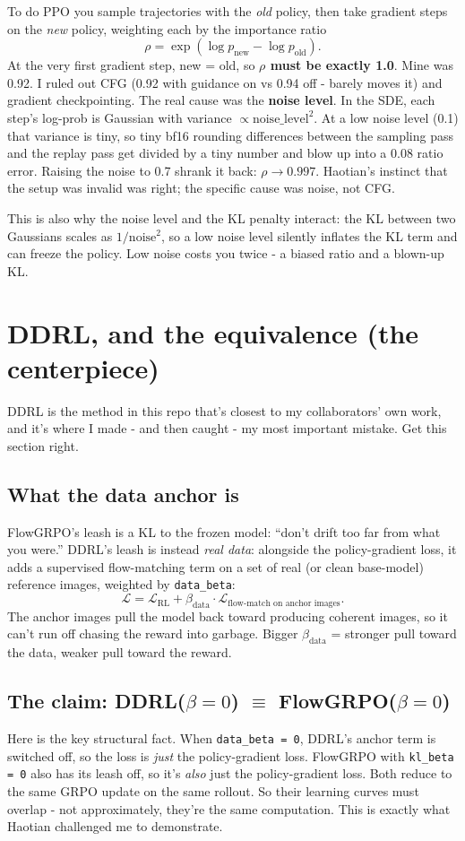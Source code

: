 \documentclass[11pt]{article}
\newcommand{\code}[1]{\texttt{\small #1}}
\begin{document}
To do PPO you sample trajectories with the \textit{old} policy, then take gradient
steps on the \textit{new} policy, weighting each by the importance ratio
\[
\rho = \exp(\log p_{\text{new}} - \log p_{\text{old}}).
\]
At the very first gradient step, new = old, so \textbf{$\rho$ must be exactly 1.0}.
Mine was 0.92. I ruled out CFG (0.92 with guidance on vs 0.94 off - barely moves it)
and gradient checkpointing. The real cause was the \textbf{noise level}. In the SDE,
each step's log-prob is Gaussian with variance $\propto \text{noise\_level}^2$. At a
low noise level (0.1) that variance is tiny, so tiny bf16 rounding differences between
the sampling pass and the replay pass get divided by a tiny number and blow up into a
0.08 ratio error. Raising the noise to 0.7 shrank it back: $\rho \to 0.997$. Haotian's
instinct that the setup was invalid was right; the specific cause was noise, not CFG.

This is also why the noise level and the KL penalty interact: the KL between two
Gaussians scales as $1/\text{noise}^2$, so a low noise level silently inflates the KL
term and can freeze the policy. Low noise costs you twice - a biased ratio and a
blown-up KL.

\section{DDRL, and the equivalence (the centerpiece)}

DDRL is the method in this repo that's closest to my collaborators' own work, and it's
where I made - and then caught - my most important mistake. Get this section right.

\subsection{What the data anchor is}
FlowGRPO's leash is a KL to the frozen model: ``don't drift too far from what you
were.'' DDRL's leash is instead \textit{real data}: alongside the policy-gradient
loss, it adds a supervised flow-matching term on a set of real (or clean base-model)
reference images, weighted by \code{data\_beta}:
\[
\mathcal L = \mathcal L_{\text{RL}} + \beta_{\text{data}}\cdot \mathcal L_{\text{flow-match on anchor images}}.
\]
The anchor images pull the model back toward producing coherent images, so it can't
run off chasing the reward into garbage. Bigger $\beta_{\text{data}}$ = stronger pull
toward the data, weaker pull toward the reward.

\subsection{The claim: DDRL($\beta{=}0$) $\equiv$ FlowGRPO($\beta{=}0$)}
Here is the key structural fact. When \code{data\_beta = 0}, DDRL's anchor term is
switched off, so the loss is \textit{just} the policy-gradient loss. FlowGRPO with
\code{kl\_beta = 0} also has its leash off, so it's \textit{also} just the
policy-gradient loss. Both reduce to the same GRPO update on the same rollout. So their
learning curves must overlap - not approximately, they're the same computation.
This is exactly what Haotian challenged me to demonstrate.
\end{document}
